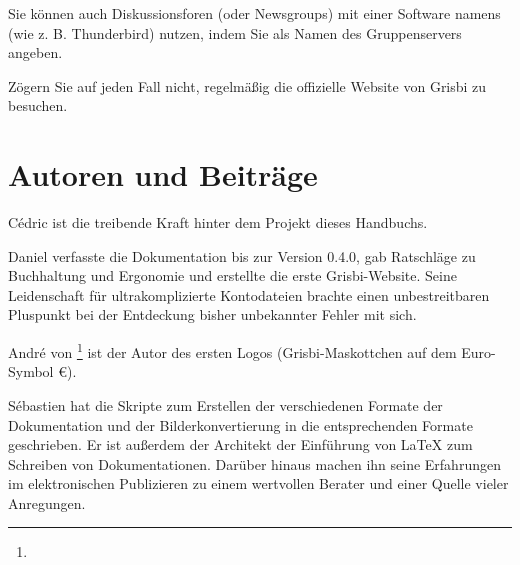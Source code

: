 
Sie können auch Diskussionsforen (oder Newsgroups) mit einer Software namens  (wie z. B. Thunderbird) nutzen, indem Sie  als Namen des Gruppenservers angeben.

Zögern Sie auf jeden Fall nicht, regelmäßig die offizielle Website von Grisbi zu besuchen.



\section{Autoren und Beiträge\label{introduction-authors}}		%


Cédric  ist die treibende Kraft hinter dem Projekt dieses Handbuchs.

Daniel  verfasste die Dokumentation bis zur Version 0.4.0, gab Ratschläge zu Buchhaltung und Ergonomie und erstellte die erste Grisbi-Website. Seine Leidenschaft für ultrakomplizierte Kontodateien brachte einen unbestreitbaren Pluspunkt bei der Entdeckung bisher unbekannter Fehler mit sich.

André  von \footnote{\urlLinuxGraphic{}} ist der Autor des ersten Logos (Grisbi-Maskottchen auf dem Euro-Symbol €).

Sébastien  hat die Skripte zum Erstellen der verschiedenen Formate der Dokumentation und der Bilderkonvertierung in die entsprechenden Formate geschrieben. Er ist außerdem der Architekt der Einführung von \gls{LaTeX} zum Schreiben von Dokumentationen. Darüber hinaus machen ihn seine Erfahrungen im elektronischen Publizieren zu einem wertvollen Berater und einer Quelle vieler Anregungen.

